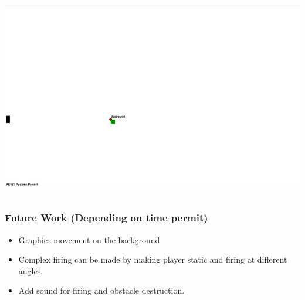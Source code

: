 \documentclass[]{beamer}
\begin{document}
\begin{frame}
\begin{center}
\begin{columns}[c]
  \includegraphics[scale=0.21,  frame]{./diagram/rsz_screen_04}
  \end {columns}
   
  \end{center}

  
  \end{frame}

\begin{frame}
  \frametitle{Future Work (Depending on time permit)}
  \begin{center}
    \begin{itemize}
    \item Graphics movement on the background
    \item Complex firing can be made by making player static and firing at different angles.
    \item Add sound for firing and obstacle destruction.
    \end{itemize}
  \end{center}
\end{frame}
\end{document}
